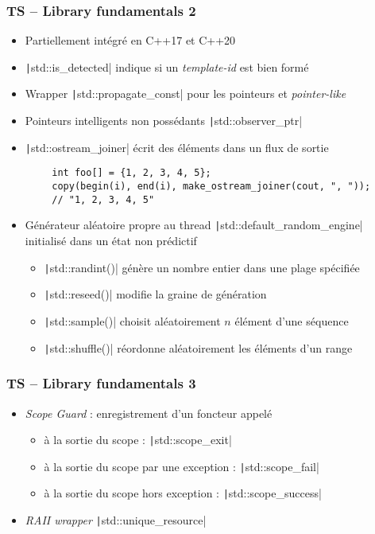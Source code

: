 \documentclass[C++.tex]{subfiles}
\begin{document}
\begin{frame}[fragile]
	\frametitle{TS -- Library fundamentals 2}
	\begin{itemize}
		\item Partiellement intégré en C++17 et C++20
		\item \texttt|std::is_detected| indique si un \textit{template-id} est bien formé
		\item Wrapper \texttt|std::propagate_const| pour les pointeurs et \textit{pointer-like}
		\item Pointeurs intelligents non possédants \texttt|std::observer_ptr|
		\item \texttt|std::ostream_joiner| écrit des éléments dans un flux de sortie
	\end{itemize}

	\begin{verbatim}
		int foo[] = {1, 2, 3, 4, 5};
		copy(begin(i), end(i), make_ostream_joiner(cout, ", "));
		// "1, 2, 3, 4, 5"
	\end{verbatim}

	\begin{itemize}
		\item Générateur aléatoire propre au thread \texttt|std::default_random_engine| initialisé dans un état non prédictif
		\begin{itemize}
			\item \texttt|std::randint()| génère un nombre entier dans une plage spécifiée
			\item \texttt|std::reseed()| modifie la graine de génération
			\item \texttt|std::sample()| choisit aléatoirement $n$ élément d'une séquence
			\item \texttt|std::shuffle()| réordonne aléatoirement les éléments d'un range
		\end{itemize}
	\end{itemize}

\end{frame}

\begin{frame}[fragile]
	\frametitle{TS -- Library fundamentals 3}
	\begin{itemize}
		\item \textit{Scope Guard} : enregistrement d'un foncteur appelé
		\begin{itemize}
			\item à la sortie du scope : \texttt|std::scope_exit|
			\item à la sortie du scope par une exception : \texttt|std::scope_fail|
			\item à la sortie du scope hors exception : \texttt|std::scope_success|
		\end{itemize}
		\item \textit{RAII wrapper} \texttt|std::unique_resource|
	\end{itemize}

\end{frame}
\end{document}
